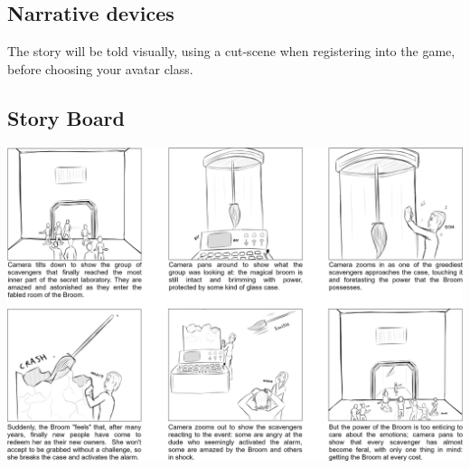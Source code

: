 \subsection{Narrative devices}

The story will be told visually, using a cut-scene when registering into the game, before choosing your avatar class.

\subsection{Story Board}

\includegraphics[height=\textwidth, angle=-90, origin=c]{../Pictures/Concept/Storyboard.png}
